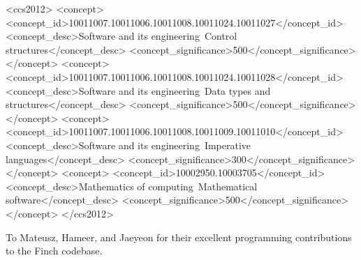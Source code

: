 \documentclass[acmsmall,screen,review,anonymous]{acmart}
\begin{document}
\begin{CCSXML}
  <ccs2012>
  <concept>
  <concept_id>10011007.10011006.10011008.10011024.10011027</concept_id>
  <concept_desc>Software and its engineering~Control structures</concept_desc>
  <concept_significance>500</concept_significance>
  </concept>
  <concept>
  <concept_id>10011007.10011006.10011008.10011024.10011028</concept_id>
  <concept_desc>Software and its engineering~Data types and structures</concept_desc>
  <concept_significance>500</concept_significance>
  </concept>
  <concept>
  <concept_id>10011007.10011006.10011008.10011009.10011010</concept_id>
  <concept_desc>Software and its engineering~Imperative languages</concept_desc>
  <concept_significance>300</concept_significance>
  </concept>
  <concept>
  <concept_id>10002950.10003705</concept_id>
  <concept_desc>Mathematics of computing~Mathematical software</concept_desc>
  <concept_significance>500</concept_significance>
  </concept>
</ccs2012>
\end{CCSXML}
  


\maketitle








\begin{acks}
    To Mateusz, Hameer, and Jaeyeon for their excellent programming contributions to the Finch codebase.
\end{acks}
\end{document}
